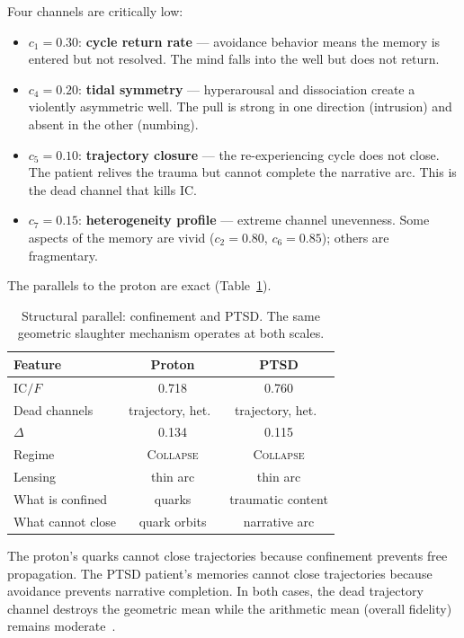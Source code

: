 \documentclass[
  aps,
  prd,
  twocolumn,
  superscriptaddress,
  nofootinbib,
  floatfix
]{revtex4-2}
\newcommand{\regime}[1]{\textsc{#1}}
\newcommand{\IC}{\mathrm{IC}}
\begin{document}
Four channels are critically low:
\begin{itemize}
\item $c_1 = 0.30$: \textbf{cycle return rate} --- avoidance
  behavior means the memory is entered but not resolved.
  The mind falls into the well but does not return.
\item $c_4 = 0.20$: \textbf{tidal symmetry} ---
  hyperarousal and dissociation create a violently
  asymmetric well.  The pull is strong in one direction
  (intrusion) and absent in the other (numbing).
\item $c_5 = 0.10$: \textbf{trajectory closure} --- the
  re-experiencing cycle does not close.  The patient
  relives the trauma but cannot complete the narrative arc.
  This is the dead channel that kills IC.
\item $c_7 = 0.15$: \textbf{heterogeneity profile} ---
  extreme channel unevenness.  Some aspects of the memory
  are vivid ($c_2 = 0.80$, $c_6 = 0.85$); others are
  fragmentary.
\end{itemize}

The parallels to the proton are exact (Table~\ref{tab:parallel}).

\begin{table}[!htbp]
\caption{\label{tab:parallel}Structural parallel: confinement
and PTSD.  The same geometric slaughter mechanism operates at
both scales.}
\begin{ruledtabular}
\begin{tabular}{lcc}
Feature & Proton & PTSD \\
\hline
$\IC/F$ & 0.718 & 0.760 \\
Dead channels & trajectory, het.\ & trajectory, het.\ \\
$\Delta$ & 0.134 & 0.115 \\
Regime & \regime{Collapse} & \regime{Collapse} \\
Lensing & thin arc & thin arc \\
What is confined & quarks & traumatic content \\
What cannot close & quark orbits & narrative arc \\
\end{tabular}
\end{ruledtabular}
\end{table}

The proton's quarks cannot close trajectories because
confinement prevents free propagation.  The PTSD patient's
memories cannot close trajectories because avoidance prevents
narrative completion.  In both cases, the dead trajectory
channel destroys the geometric mean while the arithmetic
mean (overall fidelity) remains
moderate~\cite{ehlers2000cognitive,vanderkolk2014body}.
\end{document}
